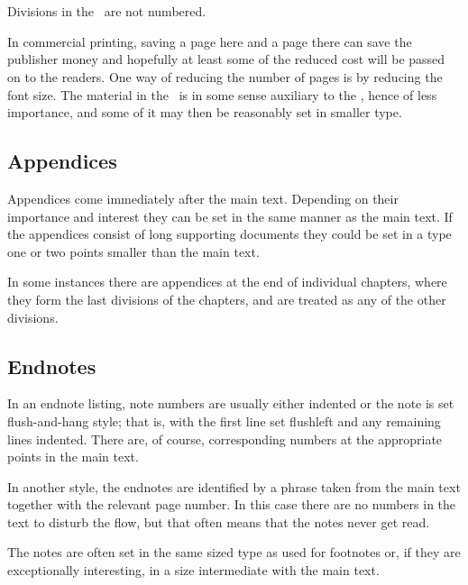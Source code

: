 \documentclass[10pt,a4paper,extrafontsizes]{memoir}
\begin{document}
\renewcommand*{\thefootnote}{\arabic{footnote}}

\section{\prBackmatter}

\begin{paracol}{2}
\switchEng
    Divisions in the \pixbackmatter\ are not numbered.

    In commercial printing, saving a page here and a page there can save the
publisher money and hopefully at least some of the reduced cost will be passed
on to the readers. One way of reducing the number of pages is by reducing
the font size. The material in the \pixbackmatter\ is in some sense auxiliary 
to the \pixmainmatter, hence of less importance, and some of it may then be 
reasonably set in smaller type.
\end{paracol}

\subsection{Appendices}

\begin{paracol}{2}
\switchEng
    Appendices come immediately after the main text. Depending
on their importance and interest they can be set in the same manner as the 
main text. If the appendices consist of long supporting documents they could
be set in a type one or two points smaller than the main text.

    In some instances there are appendices at the end of individual chapters,
where they form the last divisions of the chapters, and are treated as any of
the other divisions.
\end{paracol}

\subsection{Endnotes}

\begin{paracol}{2}
\switchEng
   In an endnote listing, note numbers are usually 
either indented or the note
is set flush-and-hang style; that is, with the 
first line set flushleft and any remaining lines indented. There are, 
of course, corresponding numbers at the appropriate points in the main text.

   In another style, the endnotes are identified by a phrase taken from the 
main text together with the relevant page number. In this case there
are no numbers in the text to disturb the flow, but that often means that the
notes never get read.

    The notes are often set in the same sized type as used for footnotes or,
if they are exceptionally interesting, in a size intermediate with the main 
text.
\end{paracol}
\end{document}
